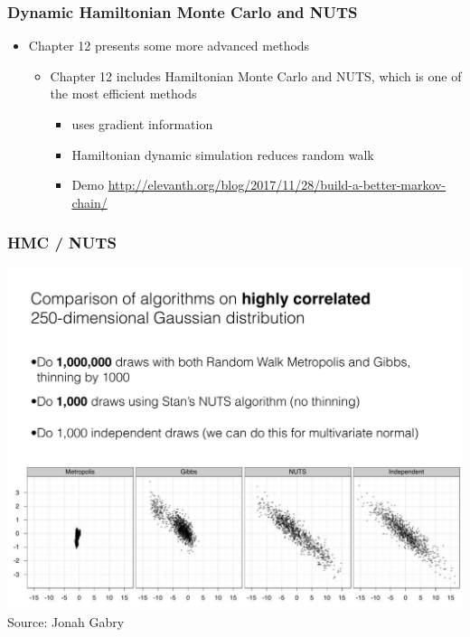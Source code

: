 \documentclass[10pt]{beamer}
\begin{document}








\begin{frame}

\frametitle{ Dynamic Hamiltonian Monte Carlo and NUTS}

  \begin{itemize}
  \item Chapter 12 presents some more advanced methods
    \begin{itemize}
    \item Chapter 12 includes Hamiltonian Monte Carlo and NUTS, which
      is one of the most efficient methods
      \begin{itemize}
      \item uses gradient information
      \item Hamiltonian dynamic simulation reduces random walk
   \item Demo {\small \url{http://elevanth.org/blog/2017/11/28/build-a-better-markov-chain/}}
      \end{itemize}
    \end{itemize}
  \end{itemize}

\end{frame}

\begin{frame}

\frametitle{ HMC / NUTS}

  \vspace{-.5\baselineskip}
  \includegraphics[width=\textwidth,clip]{figs/N250.pdf}\\
  Source: Jonah Gabry

\end{frame}
\end{document}
